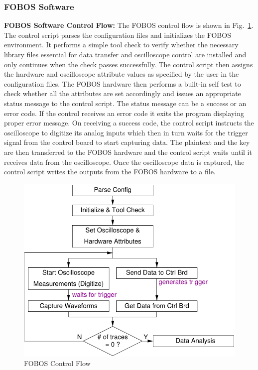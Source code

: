 \documentclass{llncs}
\numberwithin{algorithm}{chapter}
\begin{document}
\subsubsection{FOBOS Software}
%
\textbf{FOBOS Software Control Flow:}
The FOBOS control flow is shown in Fig.~\ref{fig:fobos-ctrlflow}. The control script
parses the configuration files and initializes the FOBOS
environment. It performs a simple tool check to verify whether the necessary
library files essential for data transfer and oscilloscope control are 
installed and only continues when the check passes successfully. The control script 
then assigns the hardware and oscilloscope attribute values as specified by the user 
in the configuration files. The FOBOS hardware then performs a built-in self test to
check whether all the attributes are set accordingly and issues an appropriate 
status message to the control script. The status message can be a success or an error 
code. If the control receives an error code it exits the program displaying proper error message.
On receiving a success code, the control script instructs the oscilloscope to digitize
its analog inputs which then in turn waits for the trigger 
signal from the control board to start capturing data.
The plaintext and the key are then transferred to the FOBOS hardware and the control
script waits until it receives data from the oscilloscope. Once the oscilloscope data 
is captured, the control script writes the outputs from the FOBOS hardware to a file.
\begin{figure}[ht]
\begin{center}
\includegraphics[scale=0.8]{figures/data_acq}
\caption{\label{fig:fobos-ctrlflow}FOBOS Control Flow}
\end{center} 
\vspace{-3ex}
\end{figure}
\end{document}
